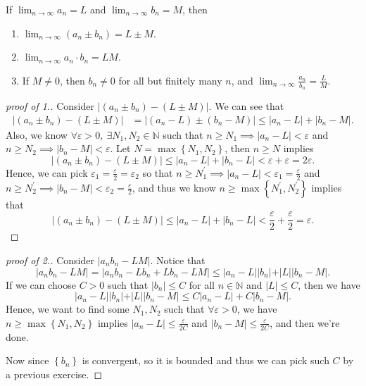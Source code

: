 \begin{proposition}
	If \(\lim_{n \to \infty} a_n = L\) and \(\lim_{n \to \infty} b_n = M \), then
	\begin{enumerate}
		\item \(\lim_{n \to \infty} (a_n \pm b_n) = L \pm M\). 
		\item \(\lim_{n \to \infty} a_n \cdot b_n = LM \). 
		\item If \(M \neq 0\), then \(b_n \neq 0\) for all but finitely many \(n\), and \(\lim_{n \to \infty} \frac{a_n}{b_n} = \frac{L}{M} \).       
	\end{enumerate}  
\end{proposition}
\begin{proof}[proof of 1.]
	Consider \(\left\vert (a_n \pm b_n) - (L \pm M) \right\vert \). We can see that 
	\begin{align*}
		\left\vert (a_n \pm b_n) - (L \pm M) \right\vert &= \left\vert (a_n - L) \pm (b_n - M) \right\vert \le \left\vert a_n - L \right\vert + \left\vert b_n - M \right\vert   .
	\end{align*}
	Also, we know \(\forall \varepsilon > 0, \ \exists N_1, N_2 \in \mathbb{N} \) such that \(n \ge N_1 \implies \vert a_n - L \vert < \varepsilon  \) and \(n \ge N_2 \implies \vert b_n - M \vert < \varepsilon  \). Let \(N = \max \left\{ N_1, N_2 \right\} \), then \(n \ge N\) implies 
	\[
		\left\vert (a_n \pm b_n) - (L \pm M) \right\vert \le \left\vert a_n - L \right\vert + \left\vert b_n - L \right\vert < \varepsilon + \varepsilon  = 2\varepsilon .   
	\]     
	Hence, we can pick \(\varepsilon_1 = \frac{\varepsilon}{2} = \varepsilon _2\) so that \(n \ge N_1^{\prime} \implies \vert a_n - L \vert < \varepsilon _1 = \frac{\varepsilon}{2} \) and \(n \ge N_2^{\prime} \implies \vert b_n - M \vert < \varepsilon _2 = \frac{\varepsilon}{2} \), and thus we know \(n \ge \max \left\{ N_1^{\prime} , N_2^{\prime}  \right\} \) implies that 
		\[
		\left\vert (a_n \pm b_n) - (L \pm M) \right\vert \le \left\vert a_n - L \right\vert + \left\vert b_n - L \right\vert < \frac{\varepsilon}{2} + \frac{\varepsilon}{2}  = \varepsilon .   
	\]      
\end{proof}
\begin{proof}[proof of 2.]
	Consider \(\left\vert a_n b_n - LM \right\vert \). Notice that 
	\[
		\left\vert a_n b_n - LM \right\vert = \left\vert a_n b_n - L b_n + Lb_n - LM \right\vert \le \vert a_n - L \vert \vert b_n \vert + \vert L \vert \vert b_n - M \vert.      
	\] 
	If we can choose \(C>0\) such that \(\vert b_n \vert \le C \) for all \(n \in \mathbb{N} \) and \(\vert L \vert \le C \), then  we have 
	\[
		\vert a_n - L \vert \vert b_n \vert + \vert L \vert \vert b_n - M \vert \le C \vert a_n - L \vert + C \vert b_n - M \vert.      
	\]    Hence, we want to find some \(N_1, N_2\) such that \(\forall \varepsilon > 0\), we have \(n \ge \max \left\{ N_1, N_2 \right\} \) implies \(\vert a_n - L \vert \le \frac{\varepsilon}{2C} \) and \(\vert b_n - M \vert \le \frac{\varepsilon}{2C} \), and then we're done. 
	
	Now since \(\left\{ b_n \right\} \) is convergent, so it is bounded and thus we can pick such \(C\) by a previous exercise. 
\end{proof}
